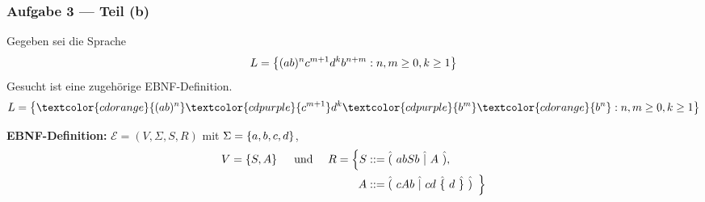 \documentclass{beamer}
\newcommand{\wdh}[1]{\hat{\{} \ #1 \ \hat{\}}}
\newcommand{\opt}[2]{\hat{(} \ #1 \ \hat{|} \ #2 \ \hat{)}}
\begin{document}
\begin{frame} \frametitle{Aufgabe 3 --- Teil (b)}
	Gegeben sei die Sprache
	\begin{equation*}
		L = \left\{ (ab)^n c^{m+1} d^k b^{n+m} : n,m \ge 0, k \ge 1 \right\}
	\end{equation*}
	Gesucht ist eine zugehörige EBNF-Definition. \pause
	\begin{equation*}
		L = \menge{\textcolor{cdorange}{(ab)^n} \textcolor{cdpurple}{c^{m+1}} d^k \textcolor{cdpurple}{b^m} \textcolor{cdorange}{b^n} : n,m \ge 0, k \ge 1}
	\end{equation*}
	\pause 
	
	\textbf{EBNF-Definition:} $\mathcal{E} = (V,\Sigma,S,R)$ mit $\Sigma = \left\{ a,b,c,d \right\}$, 
	\begin{align*}
		V = \menge{S,A} \quad \und \quad
		R = \Big\{ 
			S &::= \opt{abSb}{A}, \\
			A &::= \opt{cAb}{cd \ \wdh{d}} \enskip 
		\Big\}
	\end{align*}
\end{frame}
\end{document}
